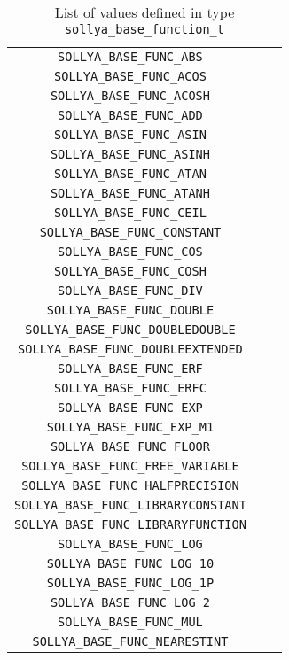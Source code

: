 \documentclass[a4paper]{article}
\begin{document}
\begin{table}[htp]
\caption{List of values defined in type \texttt{sollya\_base\_function\_t}}
\label{list_of_sollya_base_function_t}
\begin{center}
  \begin{tabular}{|c|l|l|}
    \hline
  \verb|SOLLYA_BASE_FUNC_ABS| \\
  \verb|SOLLYA_BASE_FUNC_ACOS| \\
  \verb|SOLLYA_BASE_FUNC_ACOSH| \\
  \verb|SOLLYA_BASE_FUNC_ADD| \\
  \verb|SOLLYA_BASE_FUNC_ASIN| \\
  \verb|SOLLYA_BASE_FUNC_ASINH| \\
  \verb|SOLLYA_BASE_FUNC_ATAN| \\
  \verb|SOLLYA_BASE_FUNC_ATANH| \\
  \verb|SOLLYA_BASE_FUNC_CEIL| \\
  \verb|SOLLYA_BASE_FUNC_CONSTANT| \\
  \verb|SOLLYA_BASE_FUNC_COS| \\
  \verb|SOLLYA_BASE_FUNC_COSH| \\
  \verb|SOLLYA_BASE_FUNC_DIV| \\
  \verb|SOLLYA_BASE_FUNC_DOUBLE| \\
  \verb|SOLLYA_BASE_FUNC_DOUBLEDOUBLE| \\
  \verb|SOLLYA_BASE_FUNC_DOUBLEEXTENDED| \\
  \verb|SOLLYA_BASE_FUNC_ERF| \\
  \verb|SOLLYA_BASE_FUNC_ERFC| \\
  \verb|SOLLYA_BASE_FUNC_EXP| \\
  \verb|SOLLYA_BASE_FUNC_EXP_M1| \\
  \verb|SOLLYA_BASE_FUNC_FLOOR| \\
  \verb|SOLLYA_BASE_FUNC_FREE_VARIABLE| \\
  \verb|SOLLYA_BASE_FUNC_HALFPRECISION| \\
  \verb|SOLLYA_BASE_FUNC_LIBRARYCONSTANT| \\
  \verb|SOLLYA_BASE_FUNC_LIBRARYFUNCTION| \\
  \verb|SOLLYA_BASE_FUNC_LOG| \\
  \verb|SOLLYA_BASE_FUNC_LOG_10| \\
  \verb|SOLLYA_BASE_FUNC_LOG_1P| \\
  \verb|SOLLYA_BASE_FUNC_LOG_2| \\
  \verb|SOLLYA_BASE_FUNC_MUL| \\
  \verb|SOLLYA_BASE_FUNC_NEARESTINT| \\

\end{tabular}
\end{center}
\end{table}
\end{document}
